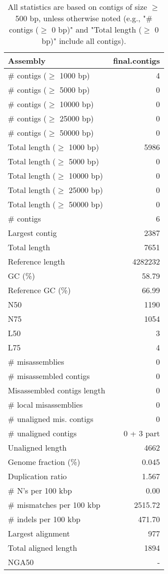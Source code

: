 \documentclass[12pt,a4paper]{article}
\begin{document}
\begin{table}[ht]
\begin{center}
\caption{All statistics are based on contigs of size $\geq$ 500 bp, unless otherwise noted (e.g., "\# contigs ($\geq$ 0 bp)" and "Total length ($\geq$ 0 bp)" include all contigs).}
\begin{tabular}{|l*{1}{|r}|}
\hline
Assembly & final.contigs \\ \hline
\# contigs ($\geq$ 1000 bp) & 4 \\ \hline
\# contigs ($\geq$ 5000 bp) & 0 \\ \hline
\# contigs ($\geq$ 10000 bp) & 0 \\ \hline
\# contigs ($\geq$ 25000 bp) & 0 \\ \hline
\# contigs ($\geq$ 50000 bp) & 0 \\ \hline
Total length ($\geq$ 1000 bp) & 5986 \\ \hline
Total length ($\geq$ 5000 bp) & 0 \\ \hline
Total length ($\geq$ 10000 bp) & 0 \\ \hline
Total length ($\geq$ 25000 bp) & 0 \\ \hline
Total length ($\geq$ 50000 bp) & 0 \\ \hline
\# contigs & 6 \\ \hline
Largest contig & 2387 \\ \hline
Total length & 7651 \\ \hline
Reference length & 4282232 \\ \hline
GC (\%) & 58.79 \\ \hline
Reference GC (\%) & 66.99 \\ \hline
N50 & 1190 \\ \hline
N75 & 1054 \\ \hline
L50 & 3 \\ \hline
L75 & 4 \\ \hline
\# misassemblies & 0 \\ \hline
\# misassembled contigs & 0 \\ \hline
Misassembled contigs length & 0 \\ \hline
\# local misassemblies & 0 \\ \hline
\# unaligned mis. contigs & 0 \\ \hline
\# unaligned contigs & 0 + 3 part \\ \hline
Unaligned length & 4662 \\ \hline
Genome fraction (\%) & 0.045 \\ \hline
Duplication ratio & 1.567 \\ \hline
\# N's per 100 kbp & 0.00 \\ \hline
\# mismatches per 100 kbp & 2515.72 \\ \hline
\# indels per 100 kbp & 471.70 \\ \hline
Largest alignment & 977 \\ \hline
Total aligned length & 1894 \\ \hline
NGA50 & - \\ \hline
\end{tabular}
\end{center}
\end{table}
\end{document}
